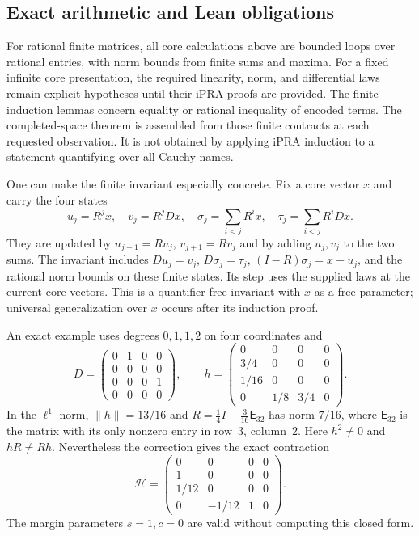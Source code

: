 \subsection{Exact arithmetic and Lean obligations}

For rational finite matrices, all core calculations above are bounded
loops over rational entries, with norm bounds from finite sums and maxima.
For a fixed infinite core presentation, the required linearity, norm, and
differential laws remain explicit hypotheses until their iPRA proofs are
provided.  The finite induction lemmas concern equality or rational
inequality of encoded terms.  The completed-space theorem is assembled
from those finite contracts at each requested observation.  It is not
obtained by applying iPRA induction to a statement quantifying over all
Cauchy names.

One can make the finite invariant especially concrete.  Fix a core vector
$x$ and carry the four states
\[
 u_j=R^jx,\quad v_j=R^jDx,\quad
 \sigma_j=\sum_{i<j}R^ix,\quad
 \tau_j=\sum_{i<j}R^iDx.
\]
They are updated by $u_{j+1}=Ru_j$, $v_{j+1}=Rv_j$ and by adding
$u_j,v_j$ to the two sums.  The invariant includes
$Du_j=v_j$, $D\sigma_j=\tau_j$,
$(I-R)\sigma_j=x-u_j$, and the rational norm bounds on these finite
states.  Its step uses the supplied laws at the current core vectors.
This is a quantifier-free invariant with $x$ as a free parameter;
universal generalization over $x$ occurs after its induction proof.

An exact example uses degrees $0,1,1,2$ on four coordinates and
\[
 D=\begin{pmatrix}
 0&1&0&0\\0&0&0&0\\0&0&0&1\\0&0&0&0
 \end{pmatrix},\qquad
 h=\begin{pmatrix}
 0&0&0&0\\3/4&0&0&0\\1/16&0&0&0\\0&1/8&3/4&0
 \end{pmatrix}.
\]
In the $\ell^1$ norm, $\|h\|=13/16$ and
$R=\tfrac14 I-\tfrac{3}{16}\mathsf E_{32}$ has norm $7/16$,
where $\mathsf E_{32}$ is the matrix with its only nonzero entry in
row~3, column~2.  Here $h^2\ne0$ and $hR\ne Rh$.  Nevertheless the
correction gives the exact contraction
\[
 \mathcal H=\begin{pmatrix}
 0&0&0&0\\1&0&0&0\\1/12&0&0&0\\0&-1/12&1&0
 \end{pmatrix}.
\]
The margin parameters $s=1,c=0$ are valid without computing this
closed form.

